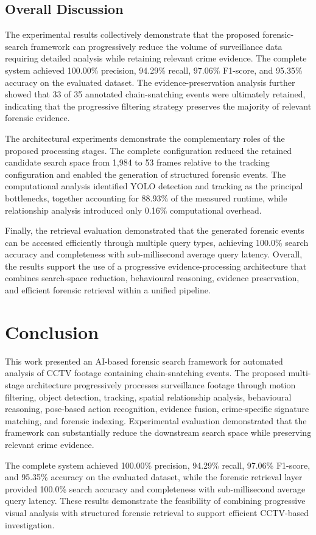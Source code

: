 \documentclass[conference]{IEEEtran}
\begin{document}
\subsection{Overall Discussion}

The experimental results collectively demonstrate that the proposed
forensic-search framework can progressively reduce the volume of
surveillance data requiring detailed analysis while retaining relevant
crime evidence. The complete system achieved 100.00\% precision,
94.29\% recall, 97.06\% F1-score, and 95.35\% accuracy on the evaluated
dataset. The evidence-preservation analysis further showed that 33 of
35 annotated chain-snatching events were ultimately retained, indicating
that the progressive filtering strategy preserves the majority of
relevant forensic evidence.

The architectural experiments demonstrate the complementary roles of
the proposed processing stages. The complete configuration reduced the
retained candidate search space from 1,984 to 53 frames relative to the
tracking configuration and enabled the generation of structured
forensic events. The computational analysis identified YOLO detection
and tracking as the principal bottlenecks, together accounting for
88.93\% of the measured runtime, while relationship analysis introduced
only 0.16\% computational overhead.

Finally, the retrieval evaluation demonstrated that the generated
forensic events can be accessed efficiently through multiple query
types, achieving 100.0\% search accuracy and completeness with
sub-millisecond average query latency. Overall, the results support the
use of a progressive evidence-processing architecture that combines
search-space reduction, behavioural reasoning, evidence preservation,
and efficient forensic retrieval within a unified pipeline.

\section{Conclusion}

This work presented an AI-based forensic search framework for automated
analysis of CCTV footage containing chain-snatching events. The proposed
multi-stage architecture progressively processes surveillance footage
through motion filtering, object detection, tracking, spatial
relationship analysis, behavioural reasoning, pose-based action
recognition, evidence fusion, crime-specific signature matching, and
forensic indexing. Experimental evaluation demonstrated that the
framework can substantially reduce the downstream search space while
preserving relevant crime evidence.

The complete system achieved 100.00\% precision, 94.29\% recall,
97.06\% F1-score, and 95.35\% accuracy on the evaluated dataset, while
the forensic retrieval layer provided 100.0\% search accuracy and
completeness with sub-millisecond average query latency. These results
demonstrate the feasibility of combining progressive visual analysis
with structured forensic retrieval to support efficient CCTV-based
investigation.

\nocite{*}


\end{document}
